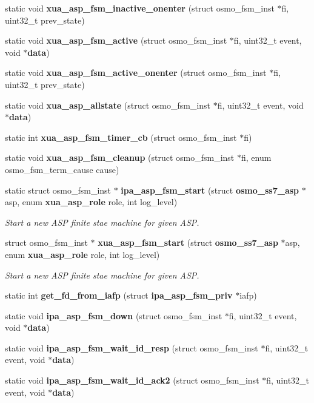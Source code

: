 \begin{DoxyCompactItemize}
\item 
static void {\bf xua\+\_\+asp\+\_\+fsm\+\_\+inactive\+\_\+onenter} (struct osmo\+\_\+fsm\+\_\+inst $\ast$fi, uint32\+\_\+t prev\+\_\+state)
\item 
static void {\bf xua\+\_\+asp\+\_\+fsm\+\_\+active} (struct osmo\+\_\+fsm\+\_\+inst $\ast$fi, uint32\+\_\+t event, void $\ast${\bf data})
\item 
static void {\bf xua\+\_\+asp\+\_\+fsm\+\_\+active\+\_\+onenter} (struct osmo\+\_\+fsm\+\_\+inst $\ast$fi, uint32\+\_\+t prev\+\_\+state)
\item 
static void {\bf xua\+\_\+asp\+\_\+allstate} (struct osmo\+\_\+fsm\+\_\+inst $\ast$fi, uint32\+\_\+t event, void $\ast${\bf data})
\item 
static int {\bf xua\+\_\+asp\+\_\+fsm\+\_\+timer\+\_\+cb} (struct osmo\+\_\+fsm\+\_\+inst $\ast$fi)
\item 
static void {\bf xua\+\_\+asp\+\_\+fsm\+\_\+cleanup} (struct osmo\+\_\+fsm\+\_\+inst $\ast$fi, enum osmo\+\_\+fsm\+\_\+term\+\_\+cause cause)
\item 
static struct osmo\+\_\+fsm\+\_\+inst $\ast$ {\bf ipa\+\_\+asp\+\_\+fsm\+\_\+start} (struct {\bf osmo\+\_\+ss7\+\_\+asp} $\ast$asp, enum {\bf xua\+\_\+asp\+\_\+role} role, int log\+\_\+level)
\begin{DoxyCompactList}\small\item\em Start a new A\+SP finite stae machine for given A\+SP. \end{DoxyCompactList}\item 
struct osmo\+\_\+fsm\+\_\+inst $\ast$ {\bf xua\+\_\+asp\+\_\+fsm\+\_\+start} (struct {\bf osmo\+\_\+ss7\+\_\+asp} $\ast$asp, enum {\bf xua\+\_\+asp\+\_\+role} role, int log\+\_\+level)
\begin{DoxyCompactList}\small\item\em Start a new A\+SP finite stae machine for given A\+SP. \end{DoxyCompactList}\item 
static int {\bf get\+\_\+fd\+\_\+from\+\_\+iafp} (struct {\bf ipa\+\_\+asp\+\_\+fsm\+\_\+priv} $\ast$iafp)
\item 
static void {\bf ipa\+\_\+asp\+\_\+fsm\+\_\+down} (struct osmo\+\_\+fsm\+\_\+inst $\ast$fi, uint32\+\_\+t event, void $\ast${\bf data})
\item 
static void {\bf ipa\+\_\+asp\+\_\+fsm\+\_\+wait\+\_\+id\+\_\+resp} (struct osmo\+\_\+fsm\+\_\+inst $\ast$fi, uint32\+\_\+t event, void $\ast${\bf data})
\item 
static void {\bf ipa\+\_\+asp\+\_\+fsm\+\_\+wait\+\_\+id\+\_\+ack2} (struct osmo\+\_\+fsm\+\_\+inst $\ast$fi, uint32\+\_\+t event, void $\ast${\bf data})

\end{DoxyCompactItemize}
